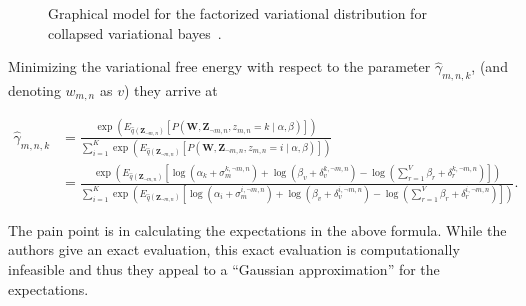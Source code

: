 \documentclass[11pt]{article}
\begin{document}
\begin{figure}[h]
  \begin{center}
  \end{center}
  \caption{Graphical model for the factorized variational distribution for
  collapsed variational bayes~\cite{Teh:2007:CVB}.}
  \label{fig:cvbvardist}
\end{figure}

Minimizing the variational free energy with respect to the parameter
$\hat{\gamma}_{m,n,k}$, (and denoting $w_{m,n}$ as $v$) they arrive at

\begin{align}
  \hat{\gamma}_{m,n,k} &=
  \frac{\exp\left(E_{\hat{q}(\mathbf{Z}_{\neg m,n})}\left[P(\mathbf{W},
  \mathbf{Z}_{\neg m,n}, z_{m,n} = k \mid \alpha, \beta)\right]\right)}
  {\sum_{i=1}^K \exp\left(E_{\hat{q}(\mathbf{Z}_{\neg m,n})}\left[P(\mathbf{W},
  \mathbf{Z}_{\neg m,n}, z_{m,n} = i \mid \alpha, \beta)\right]\right)}\\
  &= \frac{\exp\left(E_{\hat{q}(\mathbf{Z}_{\neg m,n})}\left[
  \log(\alpha_k + \sigma_m^{k,\neg m,n})
  + \log(\beta_v + \delta_v^{k,\neg m,n})
  - \log(\sum_{r=1}^V \beta_r + \delta_r^{k,\neg m,n})\right]\right)}
  {\sum_{i=1}^K \exp\left(E_{\hat{q}(\mathbf{Z}_{\neg m,n})}\left[
  \log(\alpha_i + \sigma_m^{i,\neg m,n})
  + \log(\beta_v + \delta_v^{i,\neg m,n})
  - \log(\sum_{r=1}^V \beta_r + \delta_r^{i,\neg m,n})
  \right]\right)}.
\end{align}

The pain point is in calculating the expectations in the above formula.
While the authors give an exact evaluation, this exact evaluation is
computationally infeasible and thus they appeal to a ``Gaussian
approximation'' for the expectations.
\end{document}
